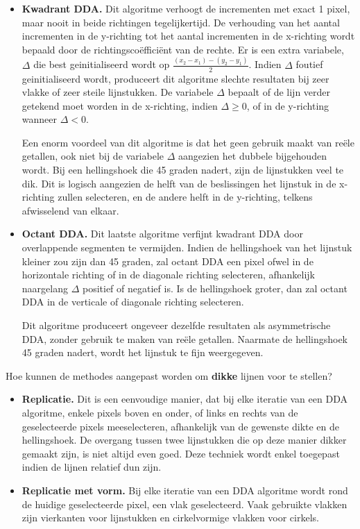 \documentclass{report}
\begin{document}
\begin{enumerate}
{\begin{itemize}
			\item \textbf{Kwadrant DDA.} Dit algoritme verhoogt de incrementen met exact 1 pixel, maar nooit in beide richtingen tegelijkertijd. De verhouding van het aantal incrementen in de y-richting tot het aantal incrementen in de x-richting wordt bepaald door de richtingscoëfficiënt van de rechte. Er is een extra variabele, $\Delta$ die best geinitialiseerd wordt op $\frac{(x_2 - x_1) - (y_2 - y_1)}{2}$. Indien $\Delta$ foutief geinitialiseerd wordt, produceert dit algoritme slechte resultaten bij zeer vlakke of zeer steile lijnstukken. De variabele $\Delta$ bepaalt of de lijn verder getekend moet worden in de x-richting, indien $\Delta \geq 0$, of in de y-richting wanneer $\Delta < 0$.
			      				
			      Een enorm voordeel van dit algoritme is dat het geen gebruik maakt van reële getallen, ook niet bij de  variabele $\Delta$ aangezien het dubbele bijgehouden wordt. Bij een hellingshoek die 45 graden nadert, zijn de lijnstukken veel te dik. Dit is logisch aangezien de helft van de beslissingen het lijnstuk in de x-richting zullen selecteren, en de andere helft in de y-richting, telkens afwisselend van elkaar.
			      				
			\item \textbf{Octant DDA.} Dit laatste algoritme verfijnt kwadrant DDA door overlappende segmenten te vermijden. Indien de hellingshoek van het lijnstuk kleiner zou zijn dan 45 graden, zal octant DDA een pixel ofwel in de horizontale richting of in de diagonale richting selecteren, afhankelijk naargelang $\Delta$ positief of negatief is. Is de hellingshoek groter, dan zal octant DDA in de verticale of diagonale richting selecteren. 
			      				
			      Dit algoritme produceert ongeveer dezelfde resultaten als asymmetrische DDA, zonder gebruik te maken van reële getallen. Naarmate de hellingshoek 45 graden nadert, wordt het lijnstuk te fijn weergegeven.
		\end{itemize}
	}
		
			
	\vraag
	{
		Hoe kunnen de methodes aangepast worden om \textbf{dikke} lijnen voor te stellen? 
	}
	{
		\begin{itemize}
			\item \textbf{Replicatie.} Dit is een eenvoudige manier, dat bij elke iteratie van een DDA algoritme, enkele pixels boven en onder, of links en rechts van de geselecteerde pixels meeselecteren, afhankelijk van de gewenste dikte en de hellingshoek. De overgang tussen twee lijnstukken die op deze manier dikker gemaakt zijn, is niet altijd even goed. Deze techniek wordt enkel toegepast indien de lijnen relatief dun zijn.
			\item \textbf{Replicatie met vorm.} Bij elke iteratie van een DDA algoritme wordt rond de huidige geselecteerde pixel, een vlak geselecteerd. Vaak gebruikte vlakken zijn vierkanten voor lijnstukken en cirkelvormige vlakken voor cirkels.
			      				

\end{itemize}}
\end{enumerate}
\end{document}
